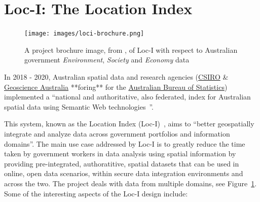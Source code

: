 \documentclass[runningheads]{llncs}
\begin{document}
\section{Loc-I: The Location Index}\label{sec:loci}

\begin{figure}[htb]
    \centering
    \texttt{[image: images/loci-brochure.png]}
    \caption{A project brochure image, from \cite{car_location_2019}, of Loc-I with respect to
    Australian government \textit{Environment}, \textit{Society} and \textit{Economy} data}
    \label{fig:loci-brochure}
\end{figure}

In 2018 - 2020, Australian spatial data and research agencies (\href{https://www.csiro.au}{CSIRO} \& \href{https://www.ga.gov.au}{Geoscience Australia} **foring** for the \href{https://www.abs.gov.au}{Australian Bureau of Statistics}) implemented a ``national and authoritative, also federated, index for Australian spatial data using Semantic Web technologies~\cite{car_location_2019}''.

This system, known as the Location Index (Loc-I)~\cite{car_location_2019}, aims to ``better geospatially integrate and analyze data across 
government portfolios and information domains''. The main use case addressed by Loc-I is to greatly reduce the time taken by government 
workers in data analysis using spatial information by providing pre-integrated, authoratitive, spatial datasets that can be used in 
online, open data scenarios, within secure data integration environments and across the two. The project deals with data from multiple domains,
see Figure~\ref{fig:loci-brochure}. Some of the interesting aspects of the Loc-I design include:
\end{document}
